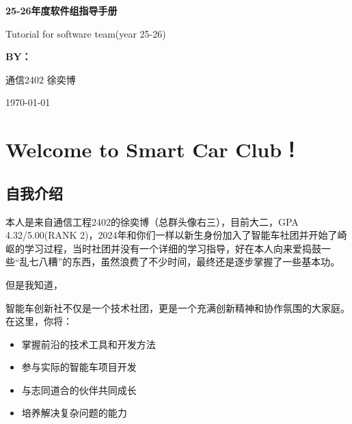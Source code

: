 \documentclass[a4paper,12pt]{article}
\begin{document}
\begin{titlepage}
\vspace{2cm}

{\LARGE\textbf{\textcolor{smartblue}{25-26年度软件组指导手册}}\par}
\vspace{0.5cm}
{\large\textcolor{smartgray}{Tutorial for software team(year 25-26)}\par}

\vspace{3cm}

{\large\textbf{BY：}\par}
\vspace{0.5cm}
{\large 通信2402 徐奕博\par}

\vspace{1.5cm}

{\large\textcolor{smartgray}{\today}\par}

\end{titlepage}

\newpage
\tableofcontents
\newpage

\section{Welcome to Smart Car Club！}

\subsection{自我介绍}
本人是来自通信工程2402的徐奕博（总群头像右三），目前大二，GPA 4.32/5.00(RANK 2)，2024年和你们一样以新生身份加入了智能车社团并开始了崎岖的学习过程，当时社团并没有一个详细的学习指导，好在本人向来爱捣鼓一些“乱七八糟”的东西，虽然浪费了不少时间，最终还是逐步掌握了一些基本功。

但是我知道，

\begin{tipbox}
智能车创新社不仅是一个技术社团，更是一个充满创新精神和协作氛围的大家庭。在这里，你将：
\begin{itemize}
    \item 掌握前沿的技术工具和开发方法
    \item 参与实际的智能车项目开发
    \item 与志同道合的伙伴共同成长
    \item 培养解决复杂问题的能力
\end{itemize}
\end{tipbox}
\end{document}
